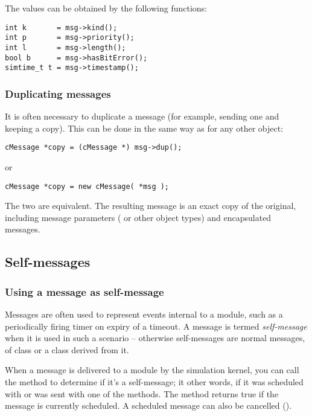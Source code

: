 The values can be obtained by the following functions:

\begin{verbatim}
int k       = msg->kind();
int p       = msg->priority();
int l       = msg->length();
bool b      = msg->hasBitError();
simtime_t t = msg->timestamp();
\end{verbatim}


\subsubsection{Duplicating messages}


It is often necessary to duplicate a message (for example, sending
one and keeping a copy). This can be done in the same way as
for any other {\opp} object:

\begin{verbatim}
cMessage *copy = (cMessage *) msg->dup();
\end{verbatim}

or

\begin{verbatim}
cMessage *copy = new cMessage( *msg );
\end{verbatim}


The two are equivalent. The resulting message is an exact copy
of the original, including message parameters ( or other
object types) and encapsulated messages.


\subsection{Self-messages}

\subsubsection{Using a message as self-message}

Messages are often used to represent events internal to a module,
such as a periodically firing timer on expiry of a timeout.
A message is termed \textit{self-message} when it is used
in such a scenario -- otherwise self-messages are normal messages,
of class  or a class derived from it.

When a message is delivered to a module by the simulation kernel,
you can call the  method to determine if it's
a self-message; it other words, if it was scheduled with
 or was sent with one of the
 methods. The  method
returns true if the message is currently scheduled. A scheduled
message can also be cancelled ().

